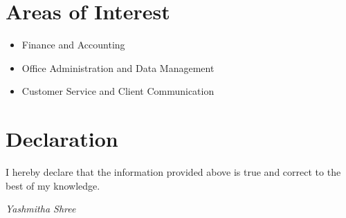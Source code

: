 \documentclass[11pt,a4paper]{article}
\begin{document}
\section*{Areas of Interest}
\begin{itemize}
    \item Finance and Accounting
    \item Office Administration and Data Management
    \item Customer Service and Client Communication
\end{itemize}

\section*{Declaration}
I hereby declare that the information provided above is true and correct to the best of my knowledge.

\vspace{15pt}
\hfill \textit{Yashmitha Shree}
\end{document}
